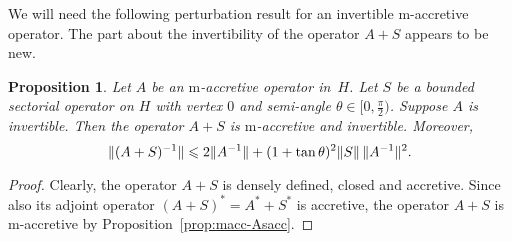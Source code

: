 \documentclass[a4paper,oneside,12pt]{amsart}
\theoremstyle{plain}
\newtheorem{proposition}[theorem]{Proposition}
\theoremstyle{definition}
\let\le=\leqslant
\DeclarePairedDelimiter\norm{\lVert}{\rVert}
\begin{document}
We will need the following perturbation result for an invertible {\ensuremath{\text{m}}}-accretive operator.
The part about the invertibility of the operator $A+S$ appears to be new.
\begin{proposition}\label{prop:pert-invertible}
Let $A$ be an {\ensuremath{\text{m}}}-accretive operator in~$H$. Let $S$ be a bounded sectorial operator on $H$ with vertex $0$ and semi-angle $\theta\in[0,\frac{\pi}{2})$. 
Suppose $A$ is invertible.
Then the operator $A + S$ is {\ensuremath{\text{m}}}-accretive and invertible. Moreover, 
\[
    \norm{(A+S)^{-1}} \le 2\norm{A^{-1}} + (1+\tan\theta)^2\norm{S} \, \norm{A^{-1}}^2.
\]
\end{proposition}
\begin{proof}
Clearly, the operator $A+S$ is densely defined, closed and accretive.
Since also its adjoint operator $(A+S)^*=A^*+S^*$ is accretive, the operator $A+S$ is {\ensuremath{\text{m}}}-accretive by Proposition~\ref{prop:macc-Asacc}.


\end{proof}
\end{document}
